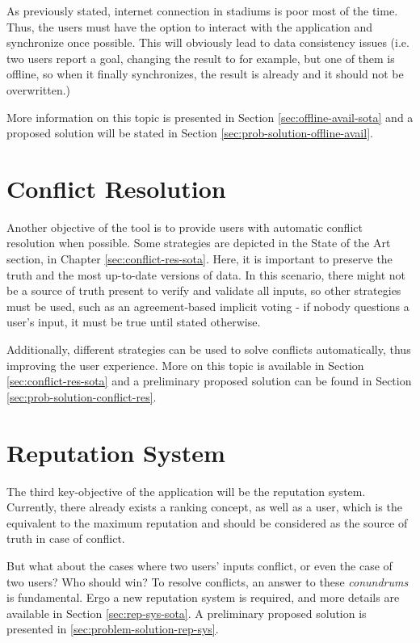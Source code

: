 As previously stated, internet connection in stadiums is poor most of the time. Thus, the users must have the option to interact with the application and synchronize once possible. This will obviously lead to data consistency issues (i.e. two users report a goal, changing the result to  for example, but one of them is offline, so when it finally synchronizes, the result is already  and it should not be overwritten.)

More information on this topic is presented in Section \ref{sec:offline-avail-sota} and a proposed solution will be stated in Section \ref{sec:prob-solution-offline-avail}.

\section{Conflict Resolution} \label{sec:conflict-res-intro}

Another objective of the tool is to provide users with automatic conflict resolution when possible. Some strategies are depicted in the State of the Art section, in Chapter \ref{sec:conflict-res-sota}. Here, it is important to preserve the truth and the most up-to-date versions of data. In this scenario, there might not be a source of truth present to verify and validate all inputs, so other strategies must be used, such as an agreement-based implicit voting - if nobody questions a user's input, it must be true until stated otherwise.

Additionally, different strategies can be used to solve conflicts automatically, thus improving the user experience. More on this topic is available in Section \ref{sec:conflict-res-sota} and a preliminary proposed solution can be found in Section \ref{sec:prob-solution-conflict-res}.

\section{Reputation System} \label{sec:rep-sys-intro}

The third key-objective of the application will be the reputation system. Currently, there already exists a ranking concept, as well as a  user, which is the equivalent to the maximum reputation and should be considered as the source of truth in case of conflict.

But what about the cases where two  users' inputs conflict, or even the case of two  users? Who should win? To resolve conflicts, an answer to these \textit{conundrums} is fundamental. Ergo a new reputation system is required, and more details are available in Section \ref{sec:rep-sys-sota}. A preliminary proposed solution is presented in \ref{sec:problem-solution-rep-sys}.
